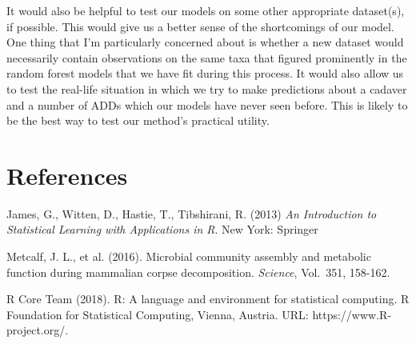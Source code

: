 \documentclass{article}
\begin{document}
It would also be helpful to test our models on some other appropriate
dataset(s), if possible.  This would give us a better sense of the
shortcomings of our model.  One thing that I'm particularly concerned
about is whether a new dataset would necessarily contain observations
on the same taxa that figured prominently in the random forest models
that we have fit during this process.  It would also allow us to test
the real-life situation in which we try to make predictions about a
cadaver and a number of ADDs which our models have never seen before.
This is likely to be the best way to test our method's practical
utility.


\section{References}

\noindent James, G., Witten, D., Hastie, T., Tibshirani, R. (2013) \textit{An
  Introduction to Statistical Learning with Applications in R}. New
York: Springer

\noindent Metcalf, J. L., et al. (2016).  Microbial community assembly and
metabolic function during mammalian corpse decomposition.
\textit{Science}, Vol.~351, 158-162.

\noindent R Core Team (2018). R: A language and environment for
statistical computing. R Foundation for Statistical Computing, Vienna,
Austria. URL: https://www.R-project.org/.
\end{document}
